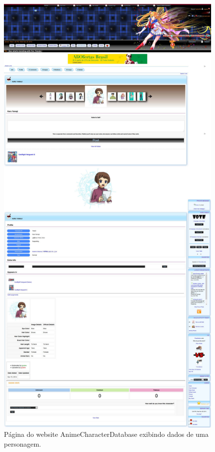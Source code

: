 \documentclass[12pt]{article}
\begin{document}
\begin{figure}[H]
\centering
\includegraphics[height=1\textheight,width=1\textwidth]{karu.pdf}
\caption{Página do website AnimeCharacterDatabase exibindo dados de uma personagem.} \label{collection}
\end{figure}
\end{document}
